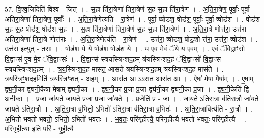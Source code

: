 \documentclass[17pt]{extarticle}
\begin{document}
57. वि॒श्व॒जिदिति॑ विश्व - जित् । . स॒हा ति॑रा॒त्रेणा॑ तिरा॒त्रेण॑ स॒ह स॒हा ति॑रा॒त्रेण॑ । . अ॒ति॒रा॒त्रेण॒ पूर्वाः॒ पूर्वा॑ अतिरा॒त्रेणा॑ तिरा॒त्रेण॒ पूर्वाः᳚ । . अ॒ति॒रा॒त्रेणेत्य॑ति - रा॒त्रेण॑ । . पूर्वा॒ ष्षोड॑श॒ षोड॑श॒ पूर्वाः॒ पूर्वा॒ ष्षोड॑श । . षोड॑श स॒ह स॒ह षोड॑श॒ षोड॑श स॒ह । . स॒हा ति॑रा॒त्रेणा॑ तिरा॒त्रेण॑ स॒ह स॒हा ति॑रा॒त्रेण॑ । . अ॒ति॒रा॒त्रे णोत्त॑रा॒ उत्त॑रा अतिरा॒त्रेणा॑ तिरा॒त्रे णोत्त॑राः । . अ॒ति॒रा॒त्रेणेत्य॑ति - रा॒त्रेण॑ । . उत्त॑रा॒ ष्षोड॑श॒ षोड॒शो त्त॑रा॒ उत्त॑रा॒ ष्षोड॑श । . उत्त॑रा॒ इत्युत् - त॒राः॒ । . षोड॑श॒ ये ये षोड॑श॒ षोड॑श॒ ये । . य ए॒व मे॒वं ॅये य ए॒वम् । . ए॒वं ॅवि॒द्वाꣳसो॑ वि॒द्वाꣳस॑ ए॒व मे॒वं ॅवि॒द्वाꣳसः॑ । . वि॒द्वाꣳस॑ स्त्रयस्त्रिꣳशद॒हम् त्र॑यस्त्रिꣳशद॒हं ॅवि॒द्वाꣳसो॑ वि॒द्वाꣳस॑ स्त्रयस्त्रिꣳशद॒हम् । . त्र॒य॒स्त्रिꣳ॒॒श॒द॒ह मास॑त॒ आस॑ते त्रयस्त्रिꣳशद॒हम् त्र॑यस्त्रिꣳशद॒ह मास॑ते । . त्र॒य॒स्त्रिꣳ॒॒श॒द॒हमिति॑ त्रयस्त्रिꣳशत् - अ॒हम् । . आस॑त॒ आ ऽऽस॑त॒ आस॑त॒ आ । . ऐषा॑ मेषा॒ मैषा᳚म् । . ए॒षा॒म् द्व्य॒नी॒का द्व्य॑नी॒कैषा॑ मेषाम् द्व्यनी॒का । . द्व्य॒नी॒का प्र॒जा प्र॒जा द्व्य॑नी॒का द्व्य॑नी॒का प्र॒जा । . द्व्य॒नी॒केति॑ द्वि - अ॒नी॒का । . प्र॒जा जा॑यते जायते प्र॒जा प्र॒जा जा॑यते । . प्र॒जेति॑ प्र - जा । . जा॒य॒ते॒ ऽति॒रा॒त्रा व॑तिरा॒त्रौ जा॑यते जायते ऽतिरा॒त्रौ । . अ॒ति॒रा॒त्रा व॒भितो॒ ऽभितो॑ ऽतिरा॒त्रा व॑तिरा॒त्रा व॒भितः॑ । . अ॒ति॒रा॒त्रावित्य॑ति - रा॒त्रौ । . अ॒भितो॑ भवतो भवतो॒ ऽभितो॒ ऽभितो॑ भवतः । . भ॒व॒तः॒ परि॑गृहीत्यै॒ परि॑गृहीत्यै भवतो भवतः॒ परि॑गृहीत्यै । . परि॑गृहीत्या॒ इति॒ परि॑ - गृ॒ही॒त्यै॒ । \newline
\end{document}
